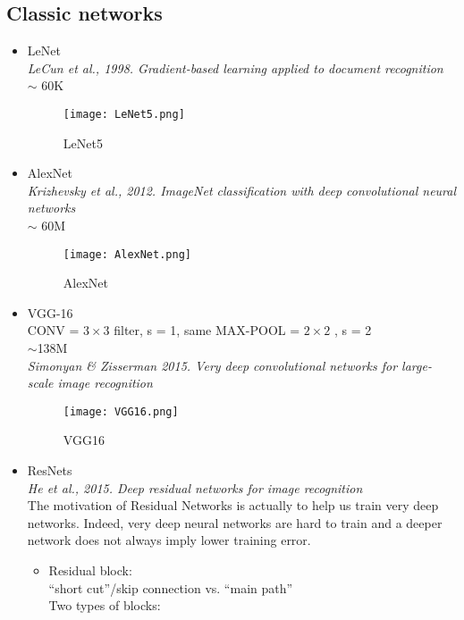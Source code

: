 \subsection{Classic networks}
\begin{itemize}
\item
    LeNet\\
    \textit{LeCun et al., 1998. Gradient-based learning applied to document recognition}\\
    $\sim$ 60K
    \begin{figure}[h]
        \centering
        \texttt{[image: LeNet5.png]}
        \caption{LeNet5}
        \label{fig:LeNet5}
    \end{figure}
\item
    AlexNet\\
    \textit{Krizhevsky et al., 2012. ImageNet classification with deep convolutional neural networks}\\
    $\sim$ 60M
    \begin{figure}[h]
        \centering
        \texttt{[image: AlexNet.png]}
        \caption{AlexNet}
        \label{fig:AlexNet}
    \end{figure}
\item
    VGG-16\\
    CONV = $3 \times 3$ filter, s = 1, same MAX-POOL = $2 \times2$ , s = 2\\
    $\sim$138M\\
    \textit{Simonyan \& Zisserman 2015. Very deep convolutional networks for large-scale image recognition}
    \begin{figure}[h]
        \centering
        \texttt{[image: VGG16.png]}
        \caption{VGG16}
        \label{fig:VGG16}
    \end{figure}
\item
    ResNets\\
    \textit{He et al., 2015. Deep residual networks for image recognition}\\
    The motivation of Residual Networks is actually to help us train very deep networks. Indeed, very deep neural networks are hard to train and a deeper network does not always imply lower training error.
    \begin{itemize}
    \item
        Residual block:\\
        ``short cut''/skip connection vs. ``main path''\\
        Two types of blocks:\\

\end{itemize}
\end{itemize}
